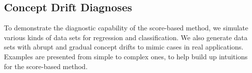 \documentclass[twoside,11pt]{article}
\begin{document}
\begin{appendices}


\section{Concept Drift Diagnoses}
\label{app:cd_diag}
To demonstrate the diagnostic capability of the score-based method, we simulate various kinds of data sets for regression and classification. We also generate data sets with abrupt and gradual concept drifts to mimic cases in real applications. Examples are presented from simple to complex ones, to help build up intuitions for the score-based method.


\end{appendices}
\end{document}
